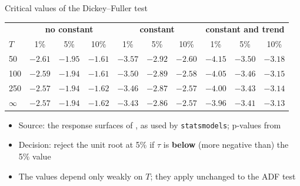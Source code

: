 \begin{frame}{Critical values of the Dickey--Fuller test}
\itemsize{\small}
\begin{center}
\scriptsize
\begin{tabular}{lccc|ccc|ccc}
\toprule
& \multicolumn{3}{c|}{\textbf{no constant}} & \multicolumn{3}{c|}{\textbf{constant}} & \multicolumn{3}{c}{\textbf{constant and trend}} \\ $T$ & 1\% & 5\% & 10\% & 1\% & 5\% & 10\% & 1\% & 5\% & 10\% \\
\midrule
50 & $\ensuremath{-}2.61$ & $\ensuremath{-}1.95$ & $\ensuremath{-}1.61$ & $\ensuremath{-}3.57$ & $\ensuremath{-}2.92$ & $\ensuremath{-}2.60$ & $\ensuremath{-}4.15$ & $\ensuremath{-}3.50$ & $\ensuremath{-}3.18$ \\
100 & $\ensuremath{-}2.59$ & $\ensuremath{-}1.94$ & $\ensuremath{-}1.61$ & $\ensuremath{-}3.50$ & $\ensuremath{-}2.89$ & $\ensuremath{-}2.58$ & $\ensuremath{-}4.05$ & $\ensuremath{-}3.46$ & $\ensuremath{-}3.15$ \\
250 & $\ensuremath{-}2.57$ & $\ensuremath{-}1.94$ & $\ensuremath{-}1.62$ & $\ensuremath{-}3.46$ & $\ensuremath{-}2.87$ & $\ensuremath{-}2.57$ & $\ensuremath{-}4.00$ & $\ensuremath{-}3.43$ & $\ensuremath{-}3.14$ \\
$\infty$ & $\ensuremath{-}2.57$ & $\ensuremath{-}1.94$ & $\ensuremath{-}1.62$ & $\ensuremath{-}3.43$ & $\ensuremath{-}2.86$ & $\ensuremath{-}2.57$ & $\ensuremath{-}3.96$ & $\ensuremath{-}3.41$ & $\ensuremath{-}3.13$ \\
\bottomrule
\end{tabular}
\end{center}
\begin{itemize}
    \item Source: the response surfaces of , as used by \texttt{statsmodels}; p-values from 
    \item Decision: reject the unit root at 5\% if $\tau$ is \textbf{below} (more negative than) the 5\% value
    \item The values depend only weakly on $T$; they apply unchanged to the ADF test
\end{itemize}
\end{frame}

